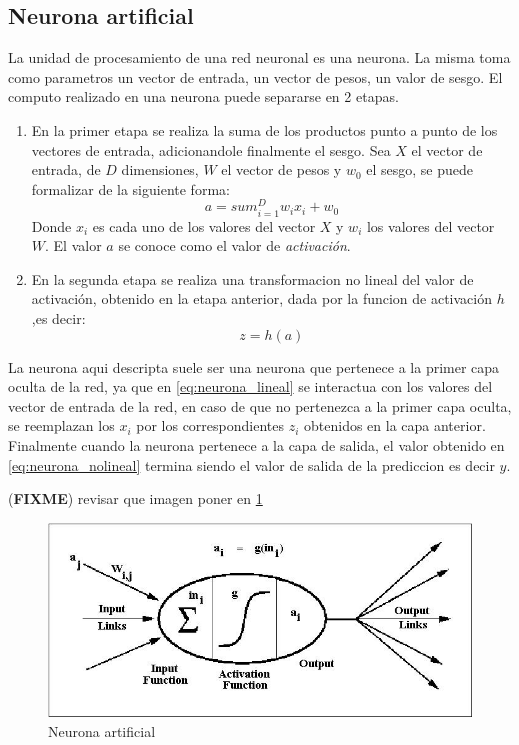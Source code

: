 \documentclass[a4paper,11pt,spanish]{book}
\newcommand*{\FIXME}[1]{{(\textbf{FIXME}) {#1}}}
\begin{document}
      \subsection {Neurona artificial} \label{sec:neurona}
	La unidad de procesamiento de una red neuronal es una neurona. La misma toma como parametros un vector de entrada, un vector de pesos, un valor de sesgo. El computo realizado
	en una neurona puede separarse en 2 etapas.
	\begin{enumerate}
	  \item En la primer etapa se realiza la suma de los productos punto a punto de los vectores de entrada, adicionandole finalmente el sesgo.
	    Sea $X$ el vector de entrada, de $D$ dimensiones, $W$ el vector de pesos y $w_0$ el sesgo, se puede formalizar de la siguiente forma:
	    \begin{equation} \label{eq:neurona_lineal}
	      a = sum_{i=1}^{D} w_{i} x_i + w_{0} 
	    \end{equation}
	    Donde $x_i$ es cada uno de los valores del vector $X$ y $w_{i}$ los valores del vector $W$. El valor $a$ se conoce como el valor de \emph{activación}.
	  \item En la segunda etapa se realiza una transformacion no lineal del valor de activación, obtenido en la etapa anterior, dada por la funcion de activación $h$,es decir:
	    \begin{equation}\label{eq:neurona_nolineal}
	      z = h(a)
	    \end{equation}
	\end{enumerate}
	La neurona aqui descripta suele ser una neurona que pertenece a la primer capa oculta de la red, ya que en \eqref{eq:neurona_lineal} se interactua 
	con los valores del vector de entrada de la red, en caso de que no pertenezca a la primer capa oculta, se reemplazan los $x_i$ por los correspondientes $z_i$
	obtenidos en la capa anterior. Finalmente cuando la neurona pertenece a la capa de salida, el valor obtenido en \eqref{eq:neurona_nolineal} termina siendo el valor de salida
	de la prediccion es decir $y$.

	\FIXME{revisar que imagen poner en \ref{fig:neuron}}
	\begin{figure}[H]
          \begin{center}
            \includegraphics[width=0.4\linewidth]{./img/neuron.jpg}
	  \caption{Neurona artificial \label{fig:neuron}}
          \end{center}
	\end{figure}
  
\end{document}
